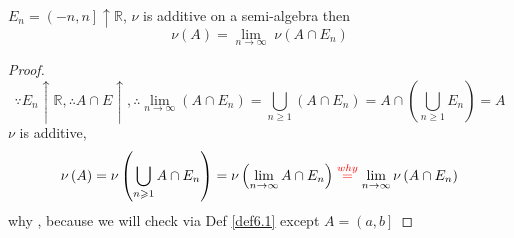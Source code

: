 \begin{remark}
	${E_n} = \left( { - n,n} \right] \uparrow \mathbb{R}$, $ \nu $ is additive on a semi-algebra then
	\begin{equation}
	\nu \left( A \right) = \mathop {\lim }\limits_{n \to \infty } \;\nu \left( {A \cap {E_n}} \right)
	\label{eq6.14}
	\end{equation}
	\label{rmk6.3}
\end{remark}

\begin{proof}
	\begin{equation}
	\because {E_n} \uparrow \mathbb{R},\therefore A \cap E \uparrow ,\therefore \mathop {\lim }\limits_{n \to \infty } \left( {A \cap {E_n}} \right) = \bigcup\limits_{n \geqslant 1} {\left( {A \cap {E_n}} \right)}  = A \cap \left( {\bigcup\limits_{n \geqslant 1} {{E_n}} } \right) = A
	\label{eq6.15}
	\end{equation}
	 $ \nu $ is additive, 
	\begin{equation}
	\nu \left( A \right) = \nu \left( {\bigcup\limits_{n \geqslant 1} {A \cap {E_n}} } \right) = \nu \left( {\mathop {\lim }\limits_{n \to \infty } A \cap {E_n}} \right) \stackrel{\color{red} why}{=} \mathop {\lim }\limits_{n \to \infty } \nu \left( {A \cap {E_n}} \right)
	\label{eq6.16}
	\end{equation}
	{\color{red} why }, because we will check via Def \ref{def6.1} except $ A = \left( {a,b} \right]$
	

\end{proof}
